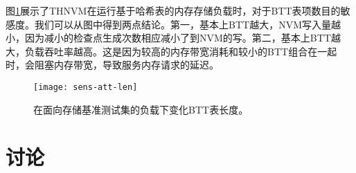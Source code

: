 图\ref{fig:sens-att-len}展示了THNVM在运行基于哈希表的内存存储负载时，对于BTT表项数目的敏感度。我们可以从图中得到两点结论。第一，基本上BTT越大，NVM写入量越小，因为减小的检查点生成次数相应减小了到NVM的写。第二，基本上BTT越大，负载吞吐率越高。这是因为较高的内存带宽消耗和较小的BTT组合在一起时，会阻塞内存带宽，导致服务内存请求的延迟。

\begin{figure}[!h]
  \centering
  \texttt{[image: sens-att-len]}
  \caption{在面向存储基准测试集的负载下变化BTT表长度。}
  \label{fig:sens-att-len}
\end{figure}

\section{讨论}
\label{sec:thnvm-discuss}

